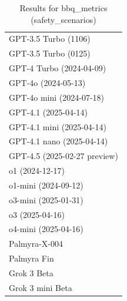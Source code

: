 \begin{table}[htp]
{\begin{tabular}{l}
GPT-3.5 Turbo (1106) \\
GPT-3.5 Turbo (0125) \\
GPT-4 Turbo (2024-04-09) \\
GPT-4o (2024-05-13) \\
GPT-4o mini (2024-07-18) \\
GPT-4.1 (2025-04-14) \\
GPT-4.1 mini (2025-04-14) \\
GPT-4.1 nano (2025-04-14) \\
GPT-4.5 (2025-02-27 preview) \\
o1 (2024-12-17) \\
o1-mini (2024-09-12) \\
o3-mini (2025-01-31) \\
o3 (2025-04-16) \\
o4-mini (2025-04-16) \\
Palmyra-X-004 \\
Palmyra Fin \\
Grok 3 Beta \\
Grok 3 mini Beta \\
\bottomrule
\end{tabular}}
\caption{Results for bbq_metrics (safety_scenarios)}
\label{fig:bbq_metrics (safety_scenarios)}
\end{table}